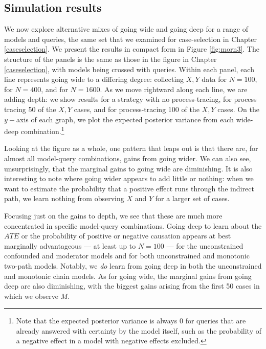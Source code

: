 \documentclass[
  12pt,
]{book}
\begin{document}
\hypertarget{simulation-results-2}{%
\subsection{Simulation results}\label{simulation-results-2}}

We now explore alternative mixes of going wide and going deep for a range of models and queries, the same set that we examined for case-selection in Chapter \ref{caseselection}. We present the results in compact form in Figure \ref{fig:morn3}. The structure of the panels is the same as those in the figure in Chapter \ref{caseselection}, with models being crossed with queries. Within each panel, each line represents going wide to a differing degree: collecting \(X,Y\) data for \(N=100\), for \(N=400\), and for \(N=1600\). As we move rightward along each line, we are adding depth: we show results for a strategy with no process-tracing, for process tracing 50 of the \(X,Y\) cases, and for process-tracing 100 of the \(X,Y\) cases. On the \(y-\)axis of each graph, we plot the expected posterior variance from each wide-deep combination.\footnote{Note that the expected posterior variance is always \(0\) for queries that are already answered with certainty by the model itself, such as the probability of a negative effect in a model with negative effects excluded.}

Looking at the figure as a whole, one pattern that leaps out is that there are, for almost all model-query combinations, gains from going wider. We can also see, unsurprisingly, that the marginal gains to going wide are diminishing. It is also interesting to note where going wider appears to add little or nothing: when we want to estimate the probability that a positive effect runs through the indirect path, we learn nothing from observing \(X\) and \(Y\) for a larger set of cases.

Focusing just on the gains to depth, we see that these are much more concentrated in specific model-query combinations. Going deep to learn about the \(ATE\) or the probability of positive or negative causation appears at best marginally advantageous --- at least up to \(N=100\) --- for the unconstrained confounded and moderator models and for both unconstrained and monotonic two-path models. Notably, we \emph{do} learn from going deep in both the unconstrained and monotonic chain models. As for going wide, the marginal gains from going deep are also diminishing, with the biggest gains arising from the first 50 cases in which we observe \(M\).
\end{document}
